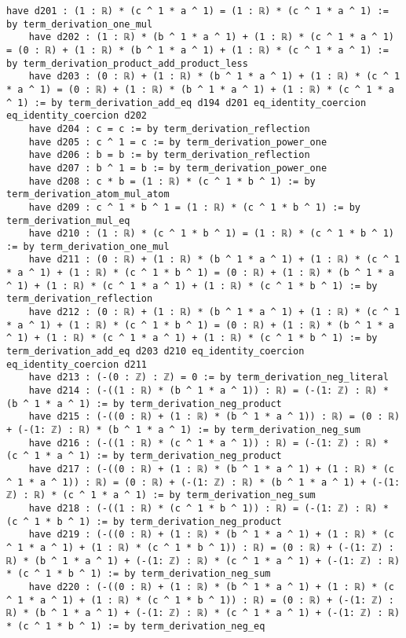 \documentclass{article}
\begin{document}
\begin{tcolorbox}[colback=white!10, width=\linewidth]
\begin{lstlisting}[language=Lean4]
    have d201 : (1 : ℝ) * (c ^ 1 * a ^ 1) = (1 : ℝ) * (c ^ 1 * a ^ 1) := by term_derivation_one_mul
    have d202 : (1 : ℝ) * (b ^ 1 * a ^ 1) + (1 : ℝ) * (c ^ 1 * a ^ 1) = (0 : ℝ) + (1 : ℝ) * (b ^ 1 * a ^ 1) + (1 : ℝ) * (c ^ 1 * a ^ 1) := by term_derivation_product_add_product_less
    have d203 : (0 : ℝ) + (1 : ℝ) * (b ^ 1 * a ^ 1) + (1 : ℝ) * (c ^ 1 * a ^ 1) = (0 : ℝ) + (1 : ℝ) * (b ^ 1 * a ^ 1) + (1 : ℝ) * (c ^ 1 * a ^ 1) := by term_derivation_add_eq d194 d201 eq_identity_coercion eq_identity_coercion d202
    have d204 : c = c := by term_derivation_reflection
    have d205 : c ^ 1 = c := by term_derivation_power_one
    have d206 : b = b := by term_derivation_reflection
    have d207 : b ^ 1 = b := by term_derivation_power_one
    have d208 : c * b = (1 : ℝ) * (c ^ 1 * b ^ 1) := by term_derivation_atom_mul_atom
    have d209 : c ^ 1 * b ^ 1 = (1 : ℝ) * (c ^ 1 * b ^ 1) := by term_derivation_mul_eq
    have d210 : (1 : ℝ) * (c ^ 1 * b ^ 1) = (1 : ℝ) * (c ^ 1 * b ^ 1) := by term_derivation_one_mul
    have d211 : (0 : ℝ) + (1 : ℝ) * (b ^ 1 * a ^ 1) + (1 : ℝ) * (c ^ 1 * a ^ 1) + (1 : ℝ) * (c ^ 1 * b ^ 1) = (0 : ℝ) + (1 : ℝ) * (b ^ 1 * a ^ 1) + (1 : ℝ) * (c ^ 1 * a ^ 1) + (1 : ℝ) * (c ^ 1 * b ^ 1) := by term_derivation_reflection
    have d212 : (0 : ℝ) + (1 : ℝ) * (b ^ 1 * a ^ 1) + (1 : ℝ) * (c ^ 1 * a ^ 1) + (1 : ℝ) * (c ^ 1 * b ^ 1) = (0 : ℝ) + (1 : ℝ) * (b ^ 1 * a ^ 1) + (1 : ℝ) * (c ^ 1 * a ^ 1) + (1 : ℝ) * (c ^ 1 * b ^ 1) := by term_derivation_add_eq d203 d210 eq_identity_coercion eq_identity_coercion d211
    have d213 : (-(0 : ℤ) : ℤ) = 0 := by term_derivation_neg_literal
    have d214 : (-((1 : ℝ) * (b ^ 1 * a ^ 1)) : ℝ) = (-(1: ℤ) : ℝ) * (b ^ 1 * a ^ 1) := by term_derivation_neg_product
    have d215 : (-((0 : ℝ) + (1 : ℝ) * (b ^ 1 * a ^ 1)) : ℝ) = (0 : ℝ) + (-(1: ℤ) : ℝ) * (b ^ 1 * a ^ 1) := by term_derivation_neg_sum
    have d216 : (-((1 : ℝ) * (c ^ 1 * a ^ 1)) : ℝ) = (-(1: ℤ) : ℝ) * (c ^ 1 * a ^ 1) := by term_derivation_neg_product
    have d217 : (-((0 : ℝ) + (1 : ℝ) * (b ^ 1 * a ^ 1) + (1 : ℝ) * (c ^ 1 * a ^ 1)) : ℝ) = (0 : ℝ) + (-(1: ℤ) : ℝ) * (b ^ 1 * a ^ 1) + (-(1: ℤ) : ℝ) * (c ^ 1 * a ^ 1) := by term_derivation_neg_sum
    have d218 : (-((1 : ℝ) * (c ^ 1 * b ^ 1)) : ℝ) = (-(1: ℤ) : ℝ) * (c ^ 1 * b ^ 1) := by term_derivation_neg_product
    have d219 : (-((0 : ℝ) + (1 : ℝ) * (b ^ 1 * a ^ 1) + (1 : ℝ) * (c ^ 1 * a ^ 1) + (1 : ℝ) * (c ^ 1 * b ^ 1)) : ℝ) = (0 : ℝ) + (-(1: ℤ) : ℝ) * (b ^ 1 * a ^ 1) + (-(1: ℤ) : ℝ) * (c ^ 1 * a ^ 1) + (-(1: ℤ) : ℝ) * (c ^ 1 * b ^ 1) := by term_derivation_neg_sum
    have d220 : (-((0 : ℝ) + (1 : ℝ) * (b ^ 1 * a ^ 1) + (1 : ℝ) * (c ^ 1 * a ^ 1) + (1 : ℝ) * (c ^ 1 * b ^ 1)) : ℝ) = (0 : ℝ) + (-(1: ℤ) : ℝ) * (b ^ 1 * a ^ 1) + (-(1: ℤ) : ℝ) * (c ^ 1 * a ^ 1) + (-(1: ℤ) : ℝ) * (c ^ 1 * b ^ 1) := by term_derivation_neg_eq

\end{lstlisting}
\end{tcolorbox}
\end{document}
